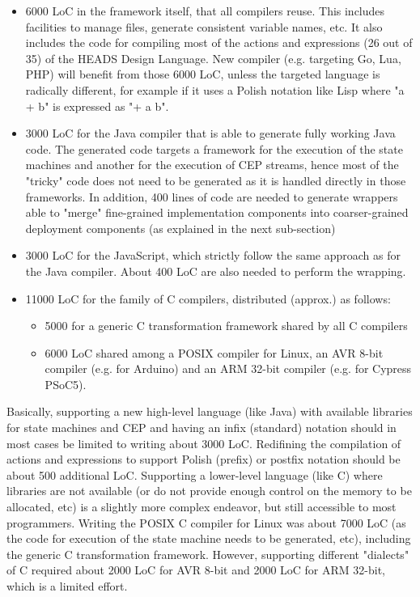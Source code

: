 \begin{itemize}
\item 6000 LoC in the framework itself, that all compilers reuse. This includes facilities to manage files, generate consistent variable names, etc. It also includes the code for compiling most of the actions and expressions (26 out of 35) of the HEADS Design Language. New compiler (e.g. targeting Go, Lua, PHP) will benefit from those 6000 LoC, unless the targeted language is radically different, for example if it uses a Polish notation like Lisp where "a + b" is expressed as "+ a b". 
\item 3000 LoC for the Java compiler that is able to generate fully working Java code. The generated code targets a framework for the execution of the state machines and another for the execution of CEP streams, hence most of the "tricky" code does not need to be generated as it is handled directly in those frameworks. In addition, 400 lines of code are needed to generate wrappers able to "merge" fine-grained implementation components into coarser-grained deployment components (as explained in the next sub-section) 
\item 3000 LoC for the JavaScript, which strictly follow the same approach as for the Java compiler. About 400 LoC are also needed to perform the wrapping. 
\item 11000 LoC for the family of C compilers, distributed (approx.) as follows: 
\begin{itemize}

\item 5000 for a generic C transformation framework shared by all C compilers 
\item 6000 LoC shared among a POSIX compiler for Linux, an AVR 8-bit compiler (e.g. for Arduino) and an ARM 32-bit compiler (e.g. for Cypress PSoC5).
\end{itemize}
\end{itemize}

Basically, supporting a new high-level language (like Java) with available libraries for state machines and CEP and having an infix (standard) notation should in most cases be limited to writing about 3000 LoC. Redifining the compilation of actions and expressions to support Polish (prefix) or postfix notation should be about 500 additional LoC. 
Supporting a lower-level language (like C) where libraries are not available (or do not provide enough control on the memory to be allocated, etc) is a slightly more complex endeavor, but still accessible to most programmers. Writing the POSIX C compiler for Linux was about 7000 LoC (as the code for execution of the state machine needs to be generated, etc), including the generic C transformation framework. However, supporting different "dialects" of C required about 2000 LoC for AVR 8-bit and 2000 LoC for ARM 32-bit, which is a limited effort. 


